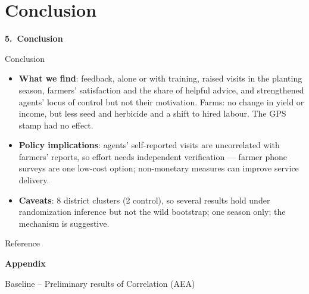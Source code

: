 \documentclass[aspectratio=169]{beamer}
\begin{document}
\section{Conclusion}
\begin{frame}[plain]
	\vfill
	\centering
	{\Huge\bfseries\textcolor{myGreen}{5.~Conclusion}}
	\vfill
\end{frame}
\begin{frame}{Conclusion}
\begin{itemize}
	\item \textbf{What we find}: feedback, alone or with training, raised visits in the planting
	season, farmers' satisfaction and the share of helpful advice, and strengthened agents' locus
	of control but not their motivation. Farms: no change in yield or income, but less seed and
	herbicide and a shift to hired labour. The GPS stamp had no effect.
	\vspace{0.3cm}
	\item \textbf{Policy implications}: agents' self-reported visits are uncorrelated with
	farmers' reports, so effort needs independent verification --- farmer phone surveys are one
	low-cost option; non-monetary measures can improve service delivery.
	\vspace{0.3cm}
	\item \textbf{Caveats}: 8 district clusters (2 control), so several results hold under
	randomization inference but not the wild bootstrap; one season only; the mechanism is suggestive.
\end{itemize}
\end{frame}

\begin{frame}[allowframebreaks]{Reference}
	\printbibliography[heading=none]
\end{frame}

\appendix
\begin{frame}[plain]
	\vfill
	\centering
	{\Huge\bfseries\textcolor{myGreen}{Appendix}}
	\vfill
\end{frame}

\begin{frame}{Baseline -- Preliminary results of Correlation (AEA)}
	\centering
	
\end{frame}
\end{document}
